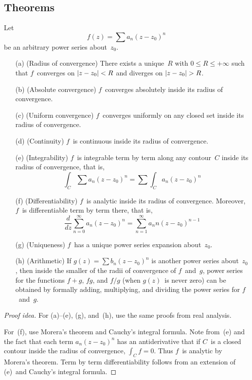 \subsection*{Theorems}
\begin{thm}
Let
\[f(z)=\sum a_n(z-z_0)^n\]
be an arbitrary power series about~\(z_0\).
\begin{enumerate}[itemsep=0pt]
\item[(a)] (Radius of convergence) There exists a unique~\(R\) with \(0\le R\le+\infty\) such that \(f\)~converges on \(|{z-z_0}|<R\) and diverges on \(\abs{z-z_0}>R\).
\item[(b)] (Absolute convergence) \(f\)~converges absolutely inside its radius of convergence.
\item[(c)] (Uniform convergence) \(f\)~converges uniformly on any closed set inside its radius of convergence.
\item[(d)] (Continuity) \(f\)~is continuous inside its radius of convergence.
\item[(e)] (Integrability) \(f\)~is integrable term by term along any contour~\(C\) inside its radius of convergence, that is,
\[\int_C\sum a_n(z-z_0)^n=\sum\int_C a_n(z-z_0)^n\]
\item[(f)] (Differentiability) \(f\)~is analytic inside its radius of convergence. Moreover, \(f\)~is differentiable term by term there, that is,
\[\frac{d}{dz}\sum_{n=0}^\infty a_n(z-z_0)^n=\sum_{n=1}^\infty a_n n(z-z_0)^{n-1}\]
\item[(g)] (Uniqueness) \(f\)~has a unique power series expansion about~\(z_0\).
\item[(h)] (Arithmetic) If \(g(z)=\sum b_n(z-z_0)^n\) is another power series about~\(z_0\), then inside the smaller of the radii of convergence of \(f\)~and~\(g\), power series for the functions \(f+g\), \(fg\), and \(f/g\) (when \(g(z)\)~is never zero) can be obtained by formally adding, multiplying, and dividing the power series for \(f\)~and~\(g\).
\end{enumerate}
\end{thm}
\begin{proof}[Proof idea]
For (a)--(e), (g), and~(h), use the same proofs from real analysis.

For~(f), use Morera's theorem and Cauchy's integral formula. Note from~(e) and the fact that each term \(a_n(z-z_0)^n\) has an antiderivative that if \(C\)~is a closed contour inside the radius of convergence, \(\int_C f=0\). Thus \(f\)~is analytic by Morera's theorem. Term by term differentiability follows from an extension of (e)~and Cauchy's integral formula.
\end{proof}

